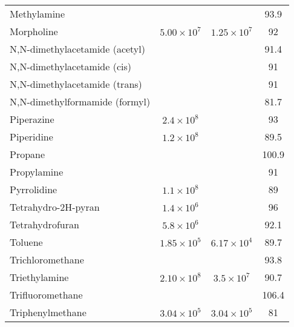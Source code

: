 \begin{center}
\begin{longtable}{l | c c c}
 Methylamine                    & $            $ & $            $ &      93.9 \\
 Morpholine                     & $ 5.00 \times 10^7$ & $1.25 \times 10^7 $ &        92 \\
 N,N-dimethylacetamide (acetyl) & $            $ & $            $ &      91.4 \\
 N,N-dimethylacetamide (cis)    & $            $ & $            $ &        91 \\
 N,N-dimethylacetamide (trans)  & $            $ & $            $ &        91 \\
 N,N-dimethylformamide (formyl) & $            $ & $            $ &      81.7 \\
 Piperazine                     & $ 2.4 \times 10^8 $ & $            $ &        93 \\
 Piperidine                     & $ 1.2 \times 10^8 $ & $            $ &      89.5 \\
 Propane                        & $            $ & $            $ &     100.9 \\
 Propylamine                    & $            $ & $            $ &        91 \\
 Pyrrolidine                    & $ 1.1 \times 10^8 $ & $            $ &        89 \\
 Tetrahydro-2H-pyran            & $ 1.4 \times 10^6 $ & $            $ &        96 \\
 Tetrahydrofuran                & $ 5.8 \times 10^6 $ & $            $ &      92.1 \\
 Toluene                        & $ 1.85 \times 10^5$ & $6.17 \times 10^4 $ &      89.7 \\
 Trichloromethane               & $            $ & $            $ &      93.8 \\
 Triethylamine                  & $ 2.10 \times 10^8$ & $3.5 \times 10^7  $ &      90.7 \\
 Trifluoromethane               & $            $ & $            $ &     106.4 \\
 Triphenylmethane               & $ 3.04 \times 10^5$ & $3.04 \times 10^5 $ &        81 \\
\end{longtable}
\end{center}

